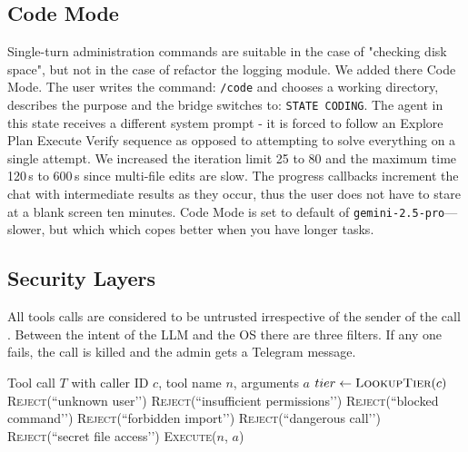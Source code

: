 \documentclass[conference]{IEEEtran}
\begin{document}
\subsection{Code Mode}
\label{sec:codemode}
Single-turn administration commands are suitable in the case of "checking disk space", but not in the case of refactor the logging module. We added there Code Mode. The user writes the command: \texttt{/code} and chooses a working directory, describes the purpose and the bridge switches to: \texttt{STATE CODING}. The agent in this state receives a different system prompt - it is forced to follow an Explore \textrightarrow Plan \textrightarrow Execute \textrightarrow Verify sequence as opposed to attempting to solve everything on a single attempt. We increased the iteration limit 25 to 80 and the maximum time 120\,s to 600\,s since multi-file edits are slow. The progress callbacks increment the chat with intermediate results as they occur, thus the user does not have to stare at a blank screen ten minutes. Code Mode is set to default of \texttt{gemini-2.5-pro}---slower, but which which copes better when you have longer tasks.


\subsection{Security Layers}
All tools calls are considered to be untrusted irrespective of the sender of the call \cite{owasp2025llm, iqbal2024llmplatform}. Between the intent of the LLM and the OS there are three filters. If any one fails, the call is killed and the admin gets a Telegram message.

\begin{algorithm}[h]
\caption{Sandbox gate for incoming tool calls}\label{alg:sandbox}
\begin{algorithmic}[1]
\REQUIRE Tool call $T$ with caller ID $c$, tool name $n$, arguments $a$
\STATE $tier \leftarrow \textsc{LookupTier}(c)$
    \RETURN \textsc{Reject}(``unknown user’’)
\ENDIF
{}
    \RETURN \textsc{Reject}(``insufficient permissions’’)
\ENDIF
{}
            \RETURN \textsc{Reject}(``blocked command’’)
        \ENDIF
    \ENDFOR
\ENDIF
{}
            \RETURN \textsc{Reject}(``forbidden import’’)
        \ENDIF
    \ENDFOR
            \RETURN \textsc{Reject}(``dangerous call’’)
        \ENDIF
    \ENDFOR
\ENDIF
{}
    \RETURN \textsc{Reject}(``secret file access’’)
\ENDIF
\RETURN \textsc{Execute}($n$, $a$)
\end{algorithmic}
\end{algorithm}
\end{document}
